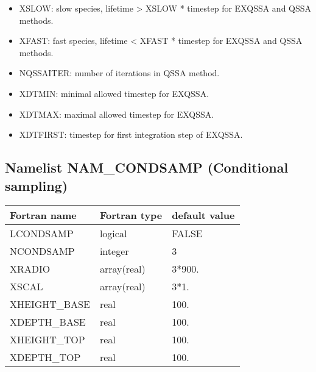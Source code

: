 \begin{itemize}
\item XSLOW: slow species, lifetime > XSLOW * timestep for EXQSSA and QSSA methods.

\item XFAST: fast species, lifetime < XFAST * timestep for EXQSSA and QSSA methods.

\item NQSSAITER: number of iterations in QSSA method.

\item XDTMIN: minimal allowed timestep for EXQSSA.

\item XDTMAX: maximal allowed timestep for EXQSSA.

\item XDTFIRST: timestep for first integration step of EXQSSA.

\end{itemize}
\subsection{Namelist NAM\_CONDSAMP (Conditional sampling)}
\begin{center}
\begin{tabular}{|l|l|l| }
\hline 
 Fortran name  & Fortran type  & default value \\
\hline
 LCONDSAMP     & logical       & FALSE         \\
 NCONDSAMP     & integer       & 3             \\
 XRADIO        & array(real)   & 3*900.     \\
 XSCAL         & array(real)   & 3*1.       \\
 XHEIGHT\_BASE & real          & 100.       \\
 XDEPTH\_BASE  & real          & 100.       \\
 XHEIGHT\_TOP  & real          & 100.       \\
 XDEPTH\_TOP   & real          & 100.       \\
\hline
\end{tabular}
\end{center}

